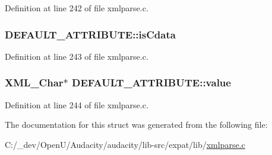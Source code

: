 Definition at line 242 of file xmlparse.\+c.

\subsubsection[{\texorpdfstring{is\+Cdata}{isCdata}}]{ D\+E\+F\+A\+U\+L\+T\+\_\+\+A\+T\+T\+R\+I\+B\+U\+T\+E\+::is\+Cdata}\hypertarget{struct_d_e_f_a_u_l_t___a_t_t_r_i_b_u_t_e_a6bf4768c04349f72a4ffdeccb6493871}{}\label{struct_d_e_f_a_u_l_t___a_t_t_r_i_b_u_t_e_a6bf4768c04349f72a4ffdeccb6493871}


Definition at line 243 of file xmlparse.\+c.

\subsubsection[{\texorpdfstring{value}{value}}]{ {\bf X\+M\+L\+\_\+\+Char}$\ast$ D\+E\+F\+A\+U\+L\+T\+\_\+\+A\+T\+T\+R\+I\+B\+U\+T\+E\+::value}\hypertarget{struct_d_e_f_a_u_l_t___a_t_t_r_i_b_u_t_e_ad1eba06bb12c82948f2aa78ceeb2e485}{}\label{struct_d_e_f_a_u_l_t___a_t_t_r_i_b_u_t_e_ad1eba06bb12c82948f2aa78ceeb2e485}


Definition at line 244 of file xmlparse.\+c.



The documentation for this struct was generated from the following file\+:\begin{DoxyCompactItemize}
\item 
C\+:/\+\_\+dev/\+Open\+U/\+Audacity/audacity/lib-\/src/expat/lib/\hyperlink{xmlparse_8c}{xmlparse.\+c}\end{DoxyCompactItemize}
